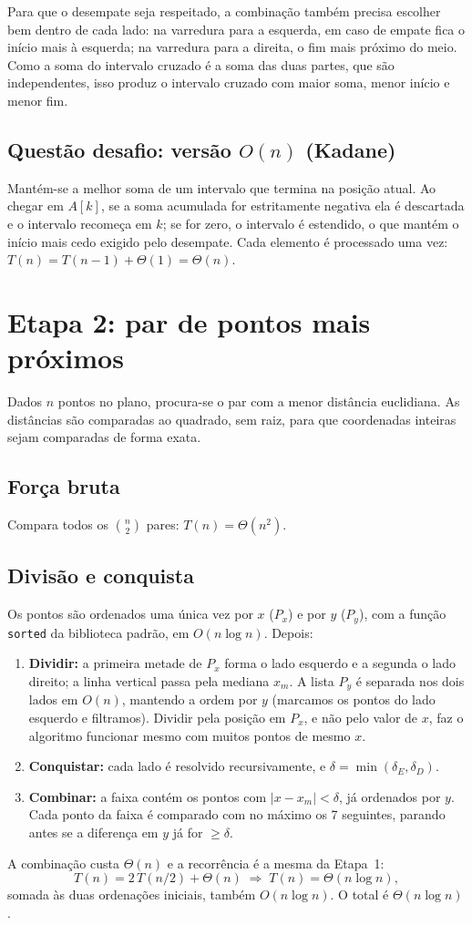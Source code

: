 \documentclass[11pt,a4paper]{article}
\begin{document}
Para que o desempate seja respeitado, a combinação também precisa escolher bem
dentro de cada lado: na varredura para a esquerda, em caso de empate fica o
início mais à esquerda; na varredura para a direita, o fim mais próximo do
meio. Como a soma do intervalo cruzado é a soma das duas partes, que são
independentes, isso produz o intervalo cruzado com maior soma, menor início e
menor fim.

\subsection{Questão desafio: versão $O(n)$ (Kadane)}
Mantém-se a melhor soma de um intervalo que termina na posição atual. Ao chegar
em $A[k]$, se a soma acumulada for estritamente negativa ela é descartada e o
intervalo recomeça em $k$; se for zero, o intervalo é estendido, o que mantém o
início mais cedo exigido pelo desempate. Cada elemento é processado uma vez:
$T(n) = T(n-1) + \Theta(1) = \Theta(n)$.

\section{Etapa 2: par de pontos mais próximos}

Dados $n$ pontos no plano, procura-se o par com a menor distância euclidiana.
As distâncias são comparadas ao quadrado, sem raiz, para que coordenadas
inteiras sejam comparadas de forma exata.

\subsection{Força bruta}
Compara todos os $\binom{n}{2}$ pares: $T(n) = \Theta(n^2)$.

\subsection{Divisão e conquista}
Os pontos são ordenados uma única vez por $x$ ($P_x$) e por $y$ ($P_y$), com a
função \texttt{sorted} da biblioteca padrão, em $O(n \log n)$. Depois:
\begin{enumerate}
  \item \textbf{Dividir:} a primeira metade de $P_x$ forma o lado esquerdo e a
  segunda o lado direito; a linha vertical passa pela mediana $x_m$. A lista
  $P_y$ é separada nos dois lados em $O(n)$, mantendo a ordem por $y$ (marcamos
  os pontos do lado esquerdo e filtramos). Dividir pela posição em $P_x$, e não
  pelo valor de $x$, faz o algoritmo funcionar mesmo com muitos pontos de mesmo $x$.
  \item \textbf{Conquistar:} cada lado é resolvido recursivamente, e
  $\delta = \min(\delta_E, \delta_D)$.
  \item \textbf{Combinar:} a faixa contém os pontos com $|x - x_m| < \delta$,
  já ordenados por $y$. Cada ponto da faixa é comparado com no máximo os 7
  seguintes, parando antes se a diferença em $y$ já for $\ge \delta$.
\end{enumerate}
A combinação custa $\Theta(n)$ e a recorrência é a mesma da Etapa~1:
\[
T(n) = 2\,T(n/2) + \Theta(n) \;\Rightarrow\; T(n) = \Theta(n \log n),
\]
somada às duas ordenações iniciais, também $O(n \log n)$. O total é
$\Theta(n \log n)$.
\end{document}
